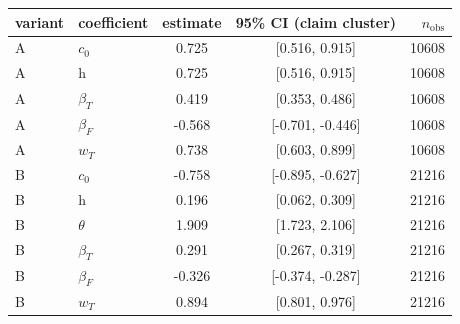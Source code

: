 \begin{tabular}{llccr}
\toprule
variant & coefficient & estimate & 95\% CI (claim cluster) & $n_{\mathrm{obs}}$ \\
\midrule
A & $c_0$ & 0.725 & [0.516, 0.915] & 10608 \\
A & h & 0.725 & [0.516, 0.915] & 10608 \\
A & $\beta_T$ & 0.419 & [0.353, 0.486] & 10608 \\
A & $\beta_F$ & -0.568 & [-0.701, -0.446] & 10608 \\
A & $w_T$ & 0.738 & [0.603, 0.899] & 10608 \\
B & $c_0$ & -0.758 & [-0.895, -0.627] & 21216 \\
B & h & 0.196 & [0.062, 0.309] & 21216 \\
B & $\theta$ & 1.909 & [1.723, 2.106] & 21216 \\
B & $\beta_T$ & 0.291 & [0.267, 0.319] & 21216 \\
B & $\beta_F$ & -0.326 & [-0.374, -0.287] & 21216 \\
B & $w_T$ & 0.894 & [0.801, 0.976] & 21216 \\
\bottomrule
\end{tabular}